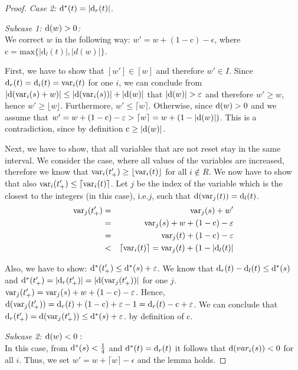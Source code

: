\documentclass[fleqn,envcountsame]{LMCS}
\newcommand{\ie}{i.e.\xspace}
\newcommand{\floor}[1]{\ensuremath{\lfloor #1 \rfloor}}
\newcommand{\ceil}[1]{\ensuremath{\lceil #1 \rceil}}
\newcommand{\corr}{\ensuremath{\mathrm{c}}}
\newcommand{\dleft}{\ensuremath{\mathrm{d}_l}}
\newcommand{\dright}{\ensuremath{\mathrm{d}_r}}
\renewcommand{\max}{\mathrm{max}}
\begin{document}
\begin{proof}
\textit{Case 2:} $\dih(t)=|\dright(t)|$.

\textit{Subcase 1: $\mathrm{d}(w)>0$:}\\
We correct $w$ in the following way: $w' = w + (1 - \corr) - \epsilon$, where
$\corr = \max\{|\dleft(t)|, |d(w)|\}$.

First, we have to show that $[w'] \in [w]$ and therefore $w' \in I$.
Since $\dright(t) = \di_i(t)= \var_i(t)$ for one $i$, 
we can conclude from $|\mathrm{d}(\mathrm{var}_i(s)+w)| \leq |\mathrm{d}(\mathrm{var}_i(s))| + |\mathrm{d}(w)|$
that $|\mathrm{d}(w)| > \varepsilon$ and therefore $w' \geq w$,
hence $w' \geq \floor{w}$.
Furthermore, $w' \leq \ceil{w}$.
Otherwise, since $\mathrm{d}(w) > 0$ and we assume that
$w' =  w + (1 -\corr) - \epsilon > \ceil{w} = w + (1 - |\di(w)|)$. This is a
contradiction, since by definition $\corr \geq |\di(w)|$.

Next, we have to show, that all variables that are not reset stay in the 
same interval. We consider the case, where all values of the variables are
increased, therefore we know that $\var_i(t'_+) \geq \floor{\var_i(t)}$
for all $i \not \in R$.
We now have to show that also $\var_i(t'_+) \leq \ceil{\var_i(t)}$.
Let $j$ be the index of the variable which is the closest to the integers
(in this case), \ie $j$, such that $\di(\var_j(t))=\dleft(t)$.
\begin{eqnarray*}
\var_j(t'_+) & = &  \var_j(s) + w' \\ 
   & = & \var_j(s)+ w + (1 - \corr) - \epsilon \\
   & = & \var_j(t) + (1- \corr) - \epsilon \\
   & < & \ceil{\var_i(t)} = \var_j(t) + (1 - |\dleft(t)| \\
\end{eqnarray*}

Also, we have to show: $\mathrm{d^*}(t'_+) \leq \mathrm{d^*}(s) + \varepsilon$.
We know that $\dright(t)-\dleft(t) \leq \dih(s)$ and
$\dih(t'_+) = |\dright(t'_+)|=|\di(\var_j(t'_+))|$ for one $j$.
$\var_j(t'_+) = \var_j(s) + w + ( 1- \corr) - \epsilon$.
Hence, $\di(\var_j(t'_+)) = \dright(t) + (1 - \corr) + 
\epsilon - 1 = \dright(t) - \corr + \epsilon$.
We can conclude that $\dright(t'_+)=\di(\var_j(t'_+)) \leq \dih(s) + \epsilon$.
by definition of $\corr$.

\textit{Subcase 2: $\mathrm{d}(w)<0:$}\\
In this case, from $\mathrm{d^*}(s) < \frac 1 4$ and $\dih(t)=\dright(t)$
it follows that $\mathrm{d}(var_i(s)) < 0$ for all $i$.
Thus, we set $w' = w + \ceil{w} - \epsilon$ and 
the lemma holds.


\end{proof}
\end{document}
